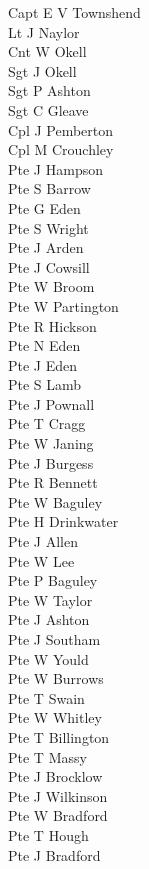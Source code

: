 \begin{multicols}{3}
  \small
  \noindent
  Capt E V Townshend \\
  Lt J Naylor \\
  Cnt W Okell \\
  Sgt J Okell \\
  Sgt P Ashton \\
  Sgt C Gleave \\
  Cpl J Pemberton \\
  Cpl M Crouchley \\
  Pte J Hampson \\
  Pte S Barrow \\
  Pte G Eden \\
  Pte S Wright \\
  Pte J Arden \\
  Pte J Cowsill \\
  Pte W Broom \\
  Pte W Partington \\
  Pte R Hickson \\
  Pte N Eden \\
  Pte J Eden \\
  Pte S Lamb \\
  Pte J Pownall \\
  Pte T Cragg \\
  Pte W Janing \\
  Pte J Burgess \\
  Pte R Bennett \\
  Pte W Baguley \\
  Pte H Drinkwater \\
  Pte J Allen \\
  Pte W Lee \\
  Pte P Baguley \\
  Pte W Taylor \\
  Pte J Ashton \\
  Pte J Southam \\
  Pte W Yould \\
  Pte W Burrows \\
  Pte T Swain \\
  Pte W Whitley \\
  Pte T Billington \\
  Pte T Massy \\
  Pte J Brocklow \\
  Pte J Wilkinson \\
  Pte W Bradford \\
  Pte T Hough \\
  Pte J Bradford \\

\end{multicols}
